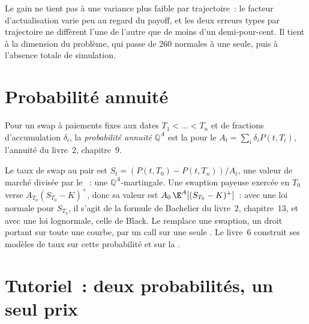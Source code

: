Le gain ne tient pas à une variance plus faible par trajectoire~: le facteur d'actualisation varie peu
au regard du payoff, et les deux erreurs types par trajectoire ne diffèrent l'une de l'autre que de moins d'un demi-pour-cent. Il tient
à la dimension du problème, qui passe de 260 normales à une seule, puis à l'absence totale de simulation.

\section{Probabilité annuité}

\begin{definition}\label{def:qm:girsanov-and-changes-of-numeraire:annuity}
Pour un swap à paiements fixes aux dates $T_1 < \dots < T_n$ et de fractions d'accumulation $\delta_i$, la \emph{probabilité
annuité} $\mathbb Q^A$ est la  pour le  $A_t =
\sum_i\delta_iP(t, T_i)$, l'annuité du livre~2, chapitre~9.
\end{definition}

Le taux de swap au pair est $S_t = (P(t, T_0) - P(t, T_n))/A_t$, une valeur de marché divisée par le ~:
une $\mathbb Q^A$-martingale. Une swaption payeuse exercée en $T_0$ verse $A_{T_0}(S_{T_0} - K)^+$, donc sa valeur est $A_0\,\E^A[(S_{T_0}
- K)^+]$~: avec une loi normale pour $S_{T_0}$, il s'agit de la formule de Bachelier du livre~2,
chapitre~13, et avec une loi lognormale, celle de Black. Le  remplace une swaption, un droit portant sur
toute une courbe, par un call sur une seule . Le livre~6 construit ses modèles de taux sur cette
probabilité et sur la .

\section{Tutoriel~: deux probabilités, un seul prix}\label{tut:qm:girsanov-and-changes-of-numeraire:caplet}

